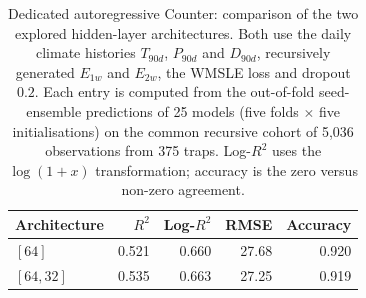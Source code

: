 \documentclass[11pt,a4paper]{article}
\begin{document}
\begin{table}
\centering
\caption{Dedicated autoregressive Counter: comparison of the two explored hidden-layer architectures. Both use the daily climate histories $T_{90d}$, $P_{90d}$ and $D_{90d}$, recursively generated $E_{1w}$ and $E_{2w}$, the WMSLE loss and dropout $0.2$. Each entry is computed from the out-of-fold seed-ensemble predictions of 25 models (five folds $\times$ five initialisations) on the common recursive cohort of 5,036 observations from 375 traps. Log-$R^2$ uses the $\log(1+x)$ transformation; accuracy is the zero versus non-zero agreement.}
\label{tab:autoregressive_architecture}
\begin{tabular}{l r r r r}
\toprule
Architecture & $R^2$ & Log-$R^2$ & RMSE & Accuracy \\
\midrule
$[64]$     & 0.521 & 0.660 & 27.68 & 0.920 \\
$[64,32]$  & 0.535 & 0.663 & 27.25 & 0.919 \\
\bottomrule
\end{tabular}
\end{table}


\printbibliography
\end{document}
